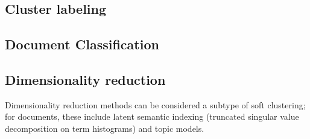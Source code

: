 \documentclass{VUMIFInfKursinis}
\begin{document}
\subsection{Cluster labeling}
\subsection{Document Classification}
\subsection{Dimensionality reduction}
Dimensionality reduction methods can be considered a subtype of soft clustering; for documents, these include latent semantic indexing (truncated singular value decomposition on term histograms) and topic models.


\printbibliography[heading=bibintoc] %

\appendix  %
\end{document}
